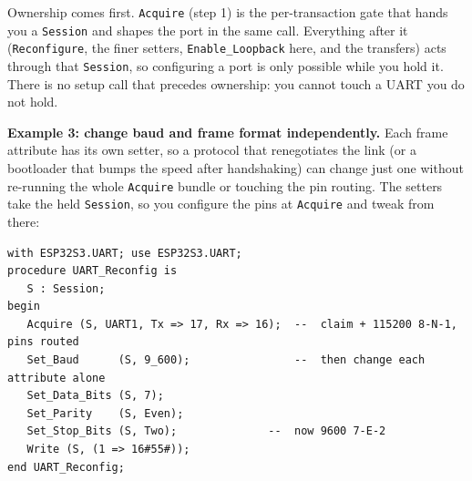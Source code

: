 Ownership comes first. \texttt{Acquire} (step 1) is the per-transaction gate that
hands you a \texttt{Session} and shapes the port in the same call. Everything
after it (\texttt{Reconfigure}, the finer setters, \texttt{Enable\_Loopback} here,
and the transfers) acts through that \texttt{Session}, so configuring a port is
only possible while you hold it. There is no setup call that precedes ownership:
you cannot touch a UART you do not hold.

\textbf{Example 3: change baud and frame format independently.} Each frame
attribute has its own setter, so a protocol that renegotiates the link (or a
bootloader that bumps the speed after handshaking) can change just one without
re-running the whole \texttt{Acquire} bundle or touching the pin routing. The
setters take the held \texttt{Session}, so you configure the pins at
\texttt{Acquire} and tweak from there:
\begin{lstlisting}
with ESP32S3.UART; use ESP32S3.UART;
procedure UART_Reconfig is
   S : Session;
begin
   Acquire (S, UART1, Tx => 17, Rx => 16);  --  claim + 115200 8-N-1, pins routed
   Set_Baud      (S, 9_600);                --  then change each attribute alone
   Set_Data_Bits (S, 7);
   Set_Parity    (S, Even);
   Set_Stop_Bits (S, Two);              --  now 9600 7-E-2
   Write (S, (1 => 16#55#));
end UART_Reconfig;
\end{lstlisting}
